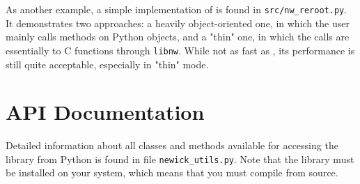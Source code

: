As another example, a simple implementation of \reroot{} is found in
\texttt{src/nw\_reroot.py}. It demonstrates two approaches: a heavily
object-oriented one, in which the user mainly calls methods on Python objects,
and a "thin" one, in which the calls are essentially to C functions through
\texttt{libnw}. While not as fast as \reroot{}, its performance is still quite
acceptable, especially in "thin" mode.

\section{API Documentation}

\noindent{}Detailed information about all classes and methods available for accessing the \nutils{} library from Python is found in file \texttt{newick\_utils.py}. Note that the library must be installed on your system, which means that you must compile from source.
